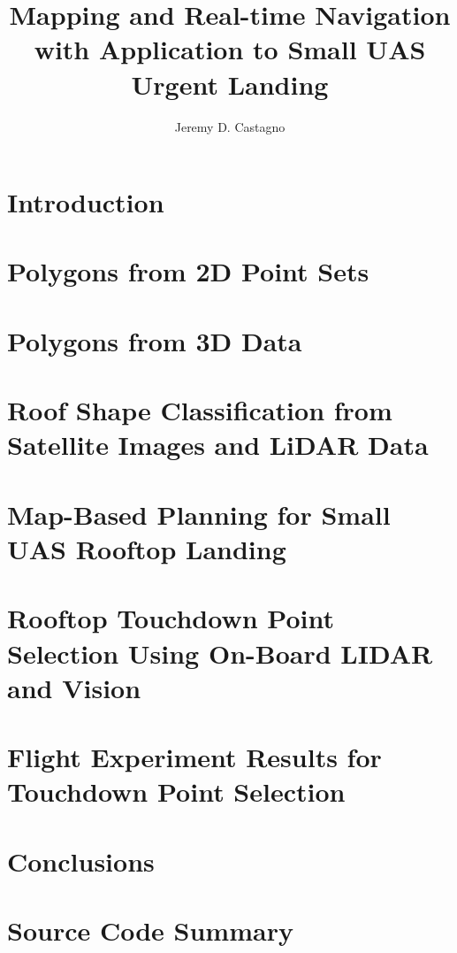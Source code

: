\documentclass[thesis]{./style/thesis-umich}
\title{Mapping and Real-time Navigation \\ with Application to Small UAS Urgent Landing}
\author{Jeremy D. Castagno}
\theoremstyle{remark}
\begin{document}

\chapter{Introduction}
 \label{ch:introduction}
 

 
\chapter{Polygons from 2D Point Sets}
 \label{ch:polylidar}
 
 
\chapter{Polygons from 3D Data}
 \label{ch:polylidar3d}
 
 
\chapter{Roof Shape Classification from Satellite Images and LiDAR Data}
 \label{ch:roofshape}
 
 
\chapter{Map-Based Planning for Small UAS Rooftop Landing}
 \label{ch:maplanding}
 
 
\chapter{Rooftop Touchdown Point Selection Using On-Board LIDAR and Vision}
 \label{ch:landingsim}
 
 
\chapter{Flight Experiment Results for Touchdown Point Selection}
 \label{ch:experiments}
 
 
\chapter{Conclusions}
 \label{ch:conclusions}
 

\appendix

\chapter{Source Code Summary}
 \label{ch:appendix_src}
 



\end{document}
